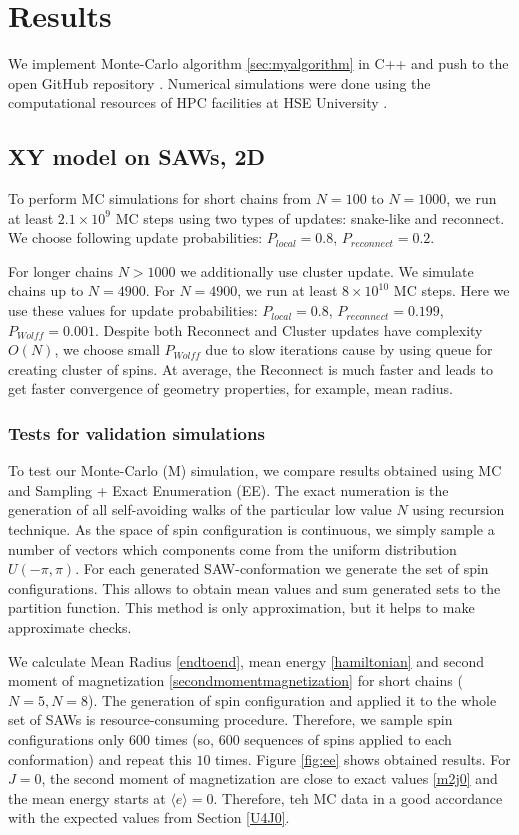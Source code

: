 \chapter{Results} \label{ch:results}
 We implement Monte-Carlo algorithm \ref{sec:myalgorithm} in C++ and push to the open GitHub repository \cite{gitsaw}. Numerical simulations were done using the computational resources of HPC facilities at HSE University \cite{Kostenetskiy_2021}.
 
 
 
\section{XY model on SAWs, 2D}
To perform MC simulations for short chains from $N=100$ to $N=1000$, we run at least $2.1 \times 10^9$ MC steps using two  types of updates: snake-like and reconnect. We choose following update probabilities: $P_{local}=0.8$, $P_{reconnect}=0.2$. 

For longer chains $N>1000$ we additionally use cluster update. We simulate chains up to $N=4900$. For $N=4900$, we run at least $8 \times 10^{10} $ MC steps. Here we use these values for update probabilities: $P_{local}=0.8$, $P_{reconnect}=0.199$, $P_{Wolff}=0.001$. Despite both Reconnect and Cluster  updates  have complexity $O(N)$, we choose small $P_{Wolff}$ due to slow iterations cause by using queue for creating cluster of spins. At average, the Reconnect is much faster and leads to get faster convergence of geometry properties, for example, mean radius. 

 
\subsection{Tests for validation simulations}
To test our Monte-Carlo (M) simulation, we compare results obtained using MC and Sampling + Exact Enumeration (EE). The exact numeration is the generation of all self-avoiding walks of the particular low value $N$ using recursion technique. As the space of spin configuration is continuous, we simply sample a number of vectors which components come from the uniform distribution $U(-\pi, \pi)$. For each generated SAW-conformation we generate the set of spin configurations. This allows to obtain mean values and sum generated sets to the partition function. This method is only approximation, but it helps to make approximate checks. 

We calculate Mean Radius \eqref{endtoend}, mean energy \eqref{hamiltonian} and   second moment of magnetization \eqref{secondmomentmagnetization} for short chains ($N=5, N=8$).  The generation of spin configuration and applied it to the whole set of SAWs is resource-consuming procedure. Therefore, we sample spin configurations only $600$ times (so, 600 sequences of spins applied to each conformation) and repeat this $10$ times. Figure \ref{fig:ee} shows obtained results.  For $J=0$, the second moment of magnetization are close to exact values \eqref{m2j0} and the mean energy starts at $\langle e \rangle = 0$. Therefore, teh MC data in a good accordance with the expected values from Section \ref{U4J0}. 

